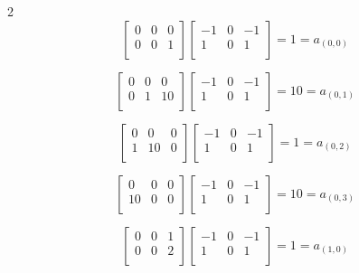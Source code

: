 \documentclass[11pt]{article}
\theoremstyle{plain}
\begin{document}
\begin{multicols}{2}
\[
	\begin{bmatrix}
		0 & 0 & 0 \\
		0 & 0 & 1 \\
	\end{bmatrix}
	\begin{bmatrix}
		-1 & 0 & -1 \\
		1  & 0 & 1  \\
	\end{bmatrix}
	= 1 = a_{(0,0)}
\]

\[
	\begin{bmatrix}
		0 & 0 & 0  \\
		0 & 1 & 10 \\
	\end{bmatrix}
	\begin{bmatrix}
		-1 & 0 & -1 \\
		1  & 0 & 1  \\
	\end{bmatrix}
	= 10 = a_{(0,1)}
\]

\[
	\begin{bmatrix}
		0 & 0  & 0 \\
		1 & 10 & 0 \\
	\end{bmatrix}
	\begin{bmatrix}
		-1 & 0 & -1 \\
		1  & 0 & 1  \\
	\end{bmatrix}
	= 1 = a_{(0,2)}
\]

\[
	\begin{bmatrix}
		0  & 0 & 0 \\
		10 & 0 & 0 \\
	\end{bmatrix}
	\begin{bmatrix}
		-1 & 0 & -1 \\
		1  & 0 & 1  \\
	\end{bmatrix}
	= 10 = a_{(0,3)}
\]

\[
	\begin{bmatrix}
		0 & 0 & 1 \\
		0 & 0 & 2 \\
	\end{bmatrix}
	\begin{bmatrix}
		-1 & 0 & -1 \\
		1  & 0 & 1  \\
	\end{bmatrix}
	= 1 = a_{(1,0)}
\]


\end{multicols}
\end{document}
